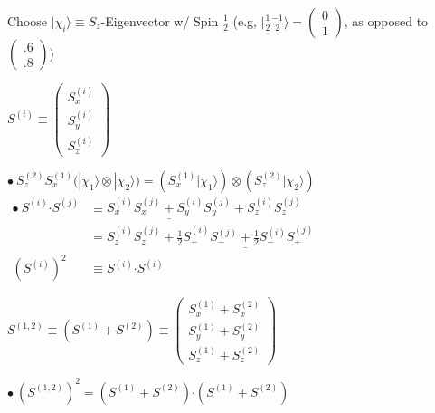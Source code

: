 \documentclass[12pt]{article}
\newcommand*{\dotP}{\boldsymbol \cdot}	%
\begin{document}
\vspace{20pt} \noindent
Choose \( | \chi_i \rangle \equiv S_z\)-Eigenvector w/ 
    Spin \(\frac{1}{2}\) (e.g, \( | \frac{1}{2} \frac{-1}{2} \rangle 
        = \left( \begin{smallmatrix} 0 \\ 1 \end{smallmatrix} \right) \), 
        as opposed to \( \left( \begin{smallmatrix} .6 \\ .8 \end{smallmatrix} \right) \))

\vspace{1cm} \noindent
\begin{minipage}[t]{.5\textwidth}
    \begin{center} \( 
        S^{(i)} \equiv 
        \left( \begin{matrix} 
            S^{(i)}_x\\[5pt] 
            S^{(i)}_y\\[5pt] 
            S^{(i)}_z 
        \end{matrix}\right) 
    \) \end{center}
        
    \vspace{5pt}
    \( 
        \bullet \ S^{(2)}_z S^{(1)}_x \Big( | \chi_1 \rangle \otimes | \chi_2 \rangle \Big)
        = \left( S^{(1)}_x | \chi_1 \rangle \right) \otimes \left( S^{(2)}_z | \chi_2 \rangle \right) 
    \)\\[10pt]
    \( \begin{aligned}
        \bullet \ S^{(i)} \dotP S^{(j)} & \equiv \underline{ S^{(i)}_x S^{(j)}_x + S^{(i)}_y S^{(j)}_y } + S^{(i)}_z S^{(j)}_z \\[5pt]
        & = S^{(i)}_z S^{(j)}_z + \underline{ \tfrac{1}{2} S^{(i)}_+ S^{(j)}_- + \tfrac{1}{2} S^{(i)}_- S^{(j)}_+ }
            \\[10pt]
        ( S^{(i)} )^2 & \equiv S^{(i)} \dotP S^{(i)} 
    \end{aligned}\)
\end{minipage}
\hfill\vline\hfill
\begin{minipage}[t]{.45\textwidth}
    \begin{center} \( 
        S^{(1,2)} \equiv \left( S^{(1)} + S^{(2)} \right) \equiv 
        \left( \begin{matrix} S^{(1)}_x + S^{(2)}_x \\[5pt]
            S^{(1)}_y + S^{(2)}_y \\[5pt]
            S^{(1)}_z + S^{(2)}_z 
        \end{matrix} \right) 
    \) \end{center}

    \vspace{5pt}
    \( \bullet \ \left( S^{(1,2)} \right)^2 =
        \left( S^{(1)} + S^{(2)} \right) \dotP \left( S^{(1)} + S^{(2)} \right) \)
\end{minipage}
\end{document}
